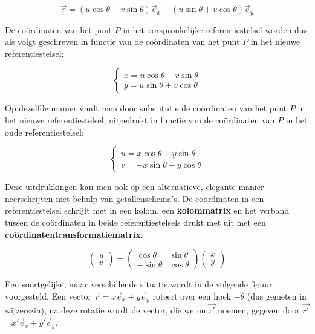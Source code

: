 \[ \vec{r}=(u \cos \theta -v \sin \theta)\vec{e}_x + (u \sin \theta + v \cos \theta)\vec{e}_y \]

De co\"{o}rdinaten van het punt $P$ in het oorspronkelijke referentiestelsel worden dus als volgt geschreven in functie van de co\"{o}rdinaten van het punt $P$ in het nieuwe referentiestelsel:

\[   
\left\{ \begin{array}{l}
x= u \cos \theta -v \sin \theta \\
y= u \sin \theta + v \cos \theta \end{array} \right.
\]

Op dezelfde manier vindt men door substitutie de co\"{o}rdinaten van het punt $P$ in het nieuwe referentiestelsel, uitgedrukt in functie van de co\"{o}rdinaten van $P$ in het oude referentiestelsel:

\[   
\left\{ \begin{array}{l}
u= x \cos \theta + y \sin \theta \\
v= -x \sin \theta + y \cos \theta \end{array} \right.
\]

Deze uitdrukkingen kan men ook op een alternatieve, elegante manier neerschrijven met behulp van getallenschema's. De co\"{o}rdinaten in een referentiestelsel schrijft met in een kolom, een {\bf kolommatrix} en het verband tussen de co\"{o}rdinaten in beide referentiestelsels drukt met uit met een {\bf co\"{o}rdinatentransformatiematrix}.

\[
\left( \begin{array}{l} u \\ v \end{array} \right)= \left( \begin{array}{rr} \cos \theta & \sin \theta \\ -\sin \theta & \cos \theta \end{array} \right) \left( \begin{array}{l} x \\ y \end{array} \right) 
\]

Een soortgelijke, maar verschillende situatie wordt in de volgende figuur voorgesteld. Een vector $\vec{r}=x \vec{e}_x + y \vec{e}_y$ roteert over een hoek $-\theta$ (dus gemeten in wijzerszin), na deze rotatie wordt de vector, die we nu $\vec{r'}$ noemen, gegeven door $\vec{r'}$=$x' \vec{e}_x + y' \vec{e}_y$. 

